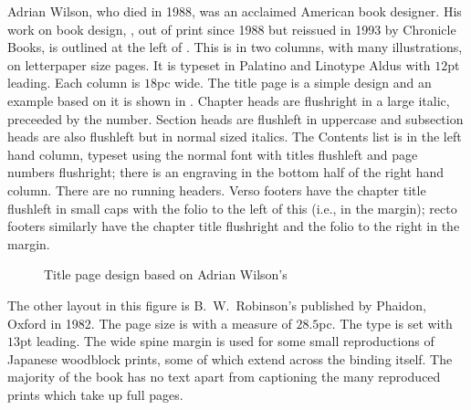 \documentclass[10pt,a4paper,oneside,extrafontsizes]{memoir}%
\begin{document}
\begin{paracol}{2}
\switchEng
    Adrian Wilson, who died in 1988, was an 
acclaimed American book designer.
His work on book design, , out of print since
1988 but reissued in 1993 by Chronicle Books, is outlined
at the left of . This is in two columns, 
with many illustrations,
on letterpaper size pages. 
It is typeset in Palatino and 
Linotype Aldus 
with $12$pt leading. 
Each column is $18$pc wide. The title page is a simple design and an
example based on it is shown in . 
Chapter heads are 
flushright in a large italic, preceeded by the number. 
Section heads are flushleft in uppercase and 
subsection heads are also flushleft but in normal sized italics.
The Contents list is in the left hand column, typeset 
using the normal font with titles flushleft and page numbers flushright;
there is an engraving in the bottom half of the right hand column.
There are no running headers. Verso footers have the
chapter title flushleft in small caps with the folio
to the left of this (i.e., in the margin); recto footers similarly have
the chapter title flushright and the folio to the right in the margin.
\end{paracol}

\begin{figure}
\centering
\begin{showtitle}
\titleDB
\end{showtitle}
\caption{Title page design based on Adrian Wilson's } \label{fig:titleDB}
\end{figure}

\begin{paracol}{2}
\switchEng
The other layout in this
figure is B.~W.~Robinson's  published
by Phaidon, Oxford in 1982. The page size is  with a
measure of $28.5$pc. The type is set with $13$pt leading. The wide spine
margin is used for some small 
reproductions of Japanese 
woodblock prints, some of which extend across the binding itself. 
The majority of the book has no text apart from captioning the many 
reproduced prints which take up full pages.
\end{paracol}
\end{document}

